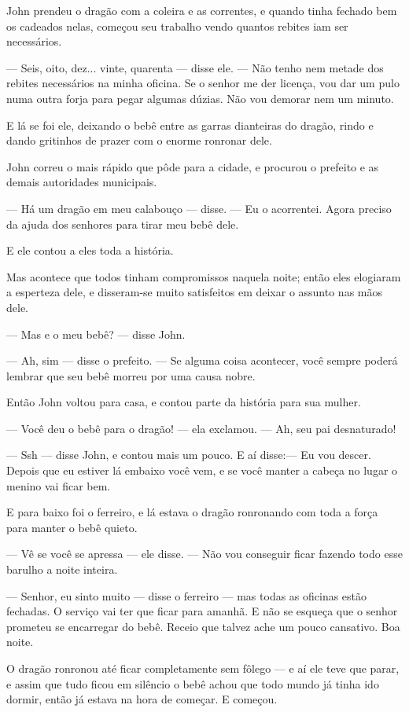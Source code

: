 John prendeu o dragão com a coleira e as correntes, e quando tinha
fechado bem os cadeados nelas, começou seu trabalho vendo quantos
rebites iam ser necessários.

— Seis, oito, dez... vinte, quarenta — disse ele. — Não tenho nem
metade dos rebites necessários na minha oficina. Se o senhor me der
licença, vou dar um pulo numa outra forja para pegar algumas dúzias.
Não vou demorar nem um minuto.

E lá se foi ele, deixando o bebê entre as garras dianteiras do dragão,
rindo e dando gritinhos de prazer com o enorme ronronar dele.

John correu o mais rápido que pôde para a cidade, e procurou o
prefeito e as demais autoridades municipais. 

— Há um dragão em meu calabouço — disse. — Eu o acorrentei. Agora
preciso da ajuda dos senhores para tirar meu bebê dele. 

E ele contou a eles toda a história.

Mas acontece que todos tinham compromissos naquela noite; então eles
elogiaram a esperteza dele, e disseram-se muito satisfeitos em deixar
o assunto nas mãos dele.

— Mas e o meu bebê? — disse John.

— Ah, sim — disse o prefeito. — Se alguma coisa acontecer, você sempre
poderá lembrar que seu bebê morreu por uma causa nobre. 

Então John voltou para casa, e contou parte da história para sua
mulher. 

— Você deu o bebê para o dragão! — ela exclamou. — Ah, seu pai
desnaturado!

— Ssh — disse John, e contou mais um pouco. E aí disse:— Eu vou
descer. Depois que eu estiver lá embaixo você vem, e se você manter a
cabeça no lugar o menino vai ficar bem.

E para baixo foi o ferreiro, e lá estava o dragão ronronando com toda
a força para manter o bebê quieto.

— Vê se você se apressa — ele disse. — Não vou conseguir ficar fazendo
todo esse barulho a noite inteira.

— Senhor, eu sinto muito — disse o ferreiro — mas todas as oficinas
estão fechadas. O serviço vai ter que ficar para amanhã. E não se
esqueça que o senhor prometeu se encarregar do bebê. Receio que
talvez ache um pouco cansativo. Boa noite.

O dragão ronronou até ficar completamente sem fôlego — e aí ele teve
que parar, e assim que tudo ficou em silêncio o bebê achou que todo
mundo já tinha ido dormir, então já estava na hora de começar. E
começou.

